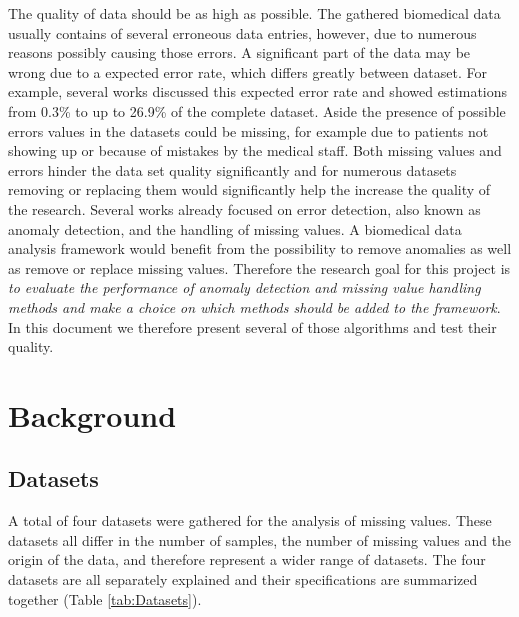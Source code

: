 \documentclass[10pt,a4paper]{article}
\begin{document}
	The quality of data should be as high as possible. The gathered biomedical data usually contains of several erroneous data entries, however, due to numerous reasons possibly causing those errors. A significant part of the data may be wrong due to a expected error rate, which differs greatly between dataset. For example, several works discussed this expected error rate and showed estimations from 0.3\%\cite{dracopoli1991ceph} to up to 26.9\%\cite{goldberg2008analysis} of the complete dataset.
	Aside the presence of possible errors values in the datasets could be missing, for example due to patients not showing up or because of mistakes by the medical staff. Both missing values and errors hinder the data set quality significantly and for numerous datasets removing or replacing them would significantly help the increase the quality of the research. Several works already focused on error detection, also known as anomaly detection\cite{stibor2005negative, chandola2009anomaly, roberts2000extreme}, and the handling of missing values\cite{donders2006gentle, cartwright2003dealing, haukoos2007advanced}. A biomedical data analysis framework would benefit from the possibility to remove anomalies as well as remove or replace missing values. Therefore the research goal for this project is \emph{to evaluate the performance of anomaly detection and missing value handling methods and make a choice on which methods should be added to the framework}. In this document we therefore present several of those algorithms and test their quality.
	
	
	\section{Background}
	\label{sec:Background}
	
	\subsection{Datasets}
	\label{subsec:Datasets}
	
	A total of four datasets were gathered for the analysis of missing values. These datasets all differ in the number of samples, the number of missing values and the origin of the data, and therefore represent a wider range of datasets. The four datasets are all separately explained and their specifications are summarized together (Table \ref{tab:Datasets}).
	
\end{document}

